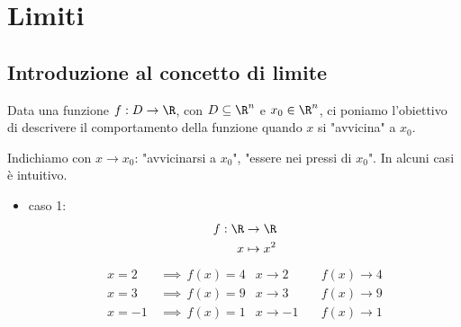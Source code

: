 \section{Limiti}
\subsection{Introduzione al concetto di limite}

Data una funzione $ f:D\to \R $, con $ D \subseteq \R^{n} $ e $ x_0 \in \R^{n} $, ci poniamo l'obiettivo di descrivere il comportamento della funzione quando $ x $ si "avvicina" a $ x_0 $.

Indichiamo con $ x\to x_0 $: "avvicinarsi a $ x_0 $", "essere nei pressi di $ x_0 $". In alcuni casi è intuitivo.
\begin{itemize}
    \item caso 1: \begin{align*}
    f:\R & \to \R \\
    x & \mapsto x^{2}
    \end{align*}\begin{align*}
        x=2 \,&\implies\, f(x)=4 & x\to 2\quad &f(x) \to 4\\
        x=3 \,&\implies\, f(x)=9 & x\to 3\quad &f(x) \to 9\\
        x=-1 \,&\implies\, f(x)=1 & x\to -1\quad &f(x) \to 1
    \end{align*}


\end{itemize}
